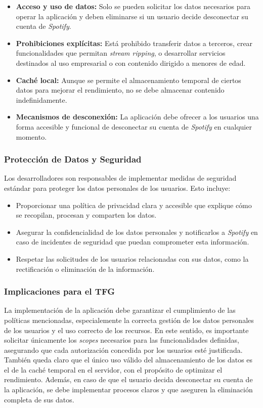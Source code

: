\begin{itemize}
    \item \textbf{Acceso y uso de datos:} Solo se pueden solicitar los datos necesarios para operar la aplicación y deben eliminarse si un usuario decide desconectar su cuenta de \textit{Spotify}.
    \item \textbf{Prohibiciones explícitas:} Está prohibido transferir datos a terceros, crear funcionalidades que permitan \textit{stream ripping}, o desarrollar servicios destinados al uso empresarial o con contenido dirigido a menores de edad.
    \item \textbf{Caché local:} Aunque se permite el almacenamiento temporal de ciertos datos para mejorar el rendimiento, no se debe almacenar contenido indefinidamente.
    \item \textbf{Mecanismos de desconexión:} La aplicación debe ofrecer a los usuarios una forma accesible y funcional de desconectar su cuenta de \textit{Spotify} en cualquier momento.
\end{itemize}

\subsubsection{Protección de Datos y Seguridad}

Los desarrolladores son responsables de implementar medidas de seguridad estándar para proteger los datos personales de los usuarios. Esto incluye:

\begin{itemize}
    \item Proporcionar una política de privacidad clara y accesible que explique cómo se recopilan, procesan y comparten los datos.
    \item Asegurar la confidencialidad de los datos personales y notificarlos a \textit{Spotify} en caso de incidentes de seguridad que puedan comprometer esta información.
    \item Respetar las solicitudes de los usuarios relacionadas con sus datos, como la rectificación o eliminación de la información.
\end{itemize}

\subsubsection{Implicaciones para el TFG}

La implementación de la aplicación debe garantizar el cumplimiento de las políticas mencionadas, especialemente la correcta gestión de los datos personales de los usuarios y el uso correcto de los recursos. En este sentido, es importante solicitar únicamente los \textit{scopes} necesarios para las funcionalidades definidas, asegurando que cada autorización concedida por los usuarios esté justificada. También queda claro que el único uso válido del almacenamiento de los datos es el de la caché temporal en el servidor, con el propósito de optimizar el rendimiento. Además, en caso de que el usuario decida desconectar su cuenta de la aplicación, se debe implementar procesos claros y que aseguren la eliminación completa de sus datos.

